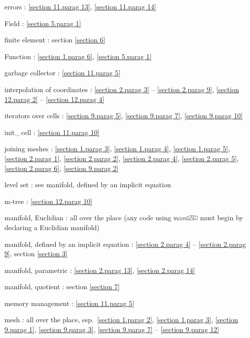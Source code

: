 \documentclass[a4paper]{scrreprt}
\def\numb{}
\newcommand\maniFEM{\leavevmode\hbox{\includegraphics[width=13mm]{manifem-small}}}
\newcommand\verm[1]{\textcolor{manif}{#1}}
\renewcommand\tt{\normalfont\ttfamily}
\begin{document}
\noindent
errors : \ref{\numb section 11.\numb parag 13}, \ref{\numb section 11.\numb parag 14}

\noindent
{\small\tt \verm{Field}} : \ref{\numb section 5.\numb parag 1}

\noindent
finite element : section \ref{\numb section 6}

\noindent
{\small\tt \verm{Function}} : \ref{\numb section 1.\numb parag 6},
\ref{\numb section 5.\numb parag 1}

\noindent
garbage collector : \ref{\numb section 11.\numb parag 5}

\noindent
interpolation of coordinates :
\ref{\numb section 2.\numb parag 3} -- \ref{\numb section 2.\numb parag 9},
\ref{\numb section 12.\numb parag 2} -- \ref{\numb section 12.\numb parag 4}

\noindent
iterators over cells : \ref{\numb section 9.\numb parag 5}, \ref{\numb section 9.\numb parag 7},
\ref{\numb section 9.\numb parag 10}

\noindent
{\small\tt init\_\,cell} : \ref{\numb section 11.\numb parag 10}

\noindent
{\small\tt join}ing meshes : \ref{\numb section 1.\numb parag 3},
\ref{\numb section 1.\numb parag 4}, \ref{\numb section 1.\numb parag 5},
\ref{\numb section 2.\numb parag 1}, \ref{\numb section 2.\numb parag 2},
\ref{\numb section 2.\numb parag 4}, \ref{\numb section 2.\numb parag 5},
\ref{\numb section 2.\numb parag 6}, \ref{\numb section 9.\numb parag 2}

\noindent
level set : see manifold, defined by an implicit equation

\noindent
m-tree : \ref{\numb section 12.\numb parag 10}

\noindent
manifold, Euclidian : all over the place\hfil\break
\hglue 15mm (any code using {\maniFEM} must begin by declaring a Euclidian manifold)

\noindent
manifold, defined by an implicit equation :
\ref{\numb section 2.\numb parag 4} -- \ref{\numb section 2.\numb parag 9},
section \ref{\numb section 3}

\noindent
manifold, parametric : \ref{\numb section 2.\numb parag 13},
\ref{\numb section 2.\numb parag 14}

\noindent
manifold, quotient : section \ref{\numb section 7}

\noindent
memory management : \ref{\numb section 11.\numb parag 5}

\noindent
mesh : all over the place, esp.\ \ref{\numb section 1.\numb parag 2},
\ref{\numb section 1.\numb parag 3}, \ref{\numb section 9.\numb parag 1},
\ref{\numb section 9.\numb parag 3},
\ref{\numb section 9.\numb parag 7} -- \ref{\numb section 9.\numb parag 12}
\end{document}
